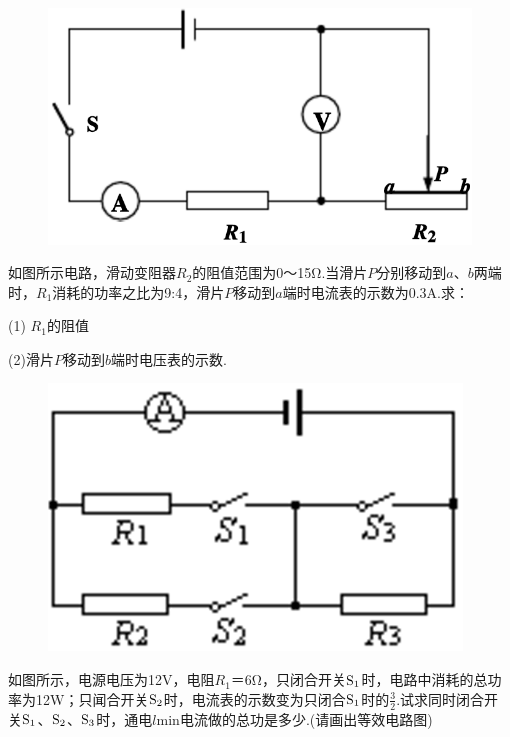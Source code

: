 \documentclass[11pt,a4paper]{article}
\newcommand{\nianfen}[1]{\hspace{-2em}{(#1\textbf{·}\textit{青岛})}}
\begin{document}
	\begin{figure}
		\includegraphics[width=\linewidth]{2008}
	\end{figure}
	
	\nianfen{2008}如图所示电路，滑动变阻器$ R_2 $的阻值范围为0～15Ω.当滑片$ P $分别移动到$ a $、$ b $两端时，$ R_1 $消耗的功率之比为9:4，滑片$ P $移动到$ a $端时电流表的示数为0.3A.求：
	
	(1) $ R_1 $的阻值
	
	(2)滑片$ P $移动到$ b $端时电压表的示数.
	
	\rule{0em}{15em}
	
	\begin{figure}
		\includegraphics[width=\linewidth]{2007}
	\end{figure}

	\nianfen{2007}如图所示，电源电压为12V，电阻$ R_1 $＝6Ω，只闭合开关$\rm S_1 $时，电路中消耗的总功率为12W；只闻合开关$\rm S_2 $时，电流表的示数变为只闭合$\rm S_1 $时的$\frac{3}{2}$.试求同时闭合开关$\rm S_1 $、$\rm S_2 $、$\rm S_3 $时，通电$ l $min电流做的总功是多少.(请画出等效电路图)
	
\end{document}
